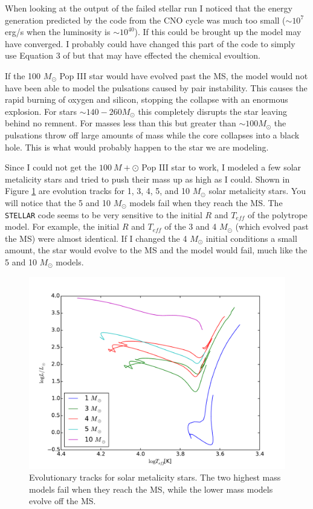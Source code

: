\documentclass[12pt]{paper}
\begin{document}
When looking at the output of the failed stellar run I noticed that the energy generation predicted by the code from the CNO cycle was much too small ($\sim 10^7$ erg/s when the luminosity is $\sim10^{40}$). If this could be brought up the model may have converged. I probably could have changed this part of the code to simply use Equation 3 of \citet{BKL} but that may have effected the chemical evoultion.

If the 100 $M_\odot$ Pop III star would have evolved past the MS, the model would not have been able to model the pulsations caused by pair instability. This causes the rapid burning of oxygen and silicon, stopping the collapse with an enormous explosion. For stars $\sim 140-260 M_\odot$ \citep{pop3}this completely disrupts the star leaving behind no remnent. For masses less than this but greater than $\sim 100 M_\odot$ the pulsations throw off large amounts of mass while the core collapses into a black hole. This is what would probably happen to the star we are modeling.

Since I could not get the $100~M+\odot$ Pop III star to work, I modeled a few solar metalicity stars and tried to push their mass up as high as I could. Shown in Figure \ref{fig:HR} are evolution tracks for 1, 3, 4, 5, and 10 $M_\odot$ solar metalicity stars. You will notice that the 5 and 10 $M_\odot$ models fail when they reach the MS. The \texttt{STELLAR} code seems to be very sensitive to the initial $R$ and $T_{eff}$ of the polytrope model. For example, the initial $R$ and $T_{eff}$ of the 3 and 4 $M_\odot$ (which evolved past the MS) were almost identical. If I changed the 4 $M_\odot$ initial conditions a small amount, the star would evolve to the MS and the model would fail, much like the 5 and 10 $M_\odot$ models. 

\begin{figure}
\begin{center}
    \includegraphics[width=\textwidth]{HR.pdf}
    \caption{Evolutionary tracks for solar metalicity stars. The two highest mass models fail when they reach the MS, while the lower mass models evolve off the MS. }
    \label{fig:HR}
\end{center}
\end{figure}
\end{document}
